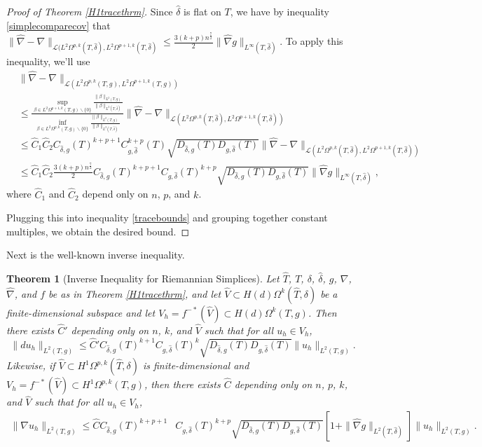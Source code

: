 \documentclass[11pt]{article}
\newtheorem{theorem}{Theorem}
\begin{document}
\begin{proof}[Proof of Theorem \ref{H1tracethrm}]
Since $\hat \delta$ is flat on $T$, we have by inequality \ref{simplecomparecov} that $\|\hat \nabla - \nabla\|_{\mathcal{L}(L^2\Omega^{p,k}(T,\hat \delta),L^2\Omega^{p+1,k}(T,\hat \delta)} \le \frac{3(k+p)n^\frac{7}{2}}{2}\|\hat \nabla g\|_{L^\infty(T,\hat \delta)}$. To apply this inequality, we'll use
\begin{align*}
&\|\hat \nabla - \nabla\|_{\mathcal{L}(L^2\Omega^{p,k}(T,g),L^2\Omega^{p+1,k}(T,g))} \\ 
&\le \frac{\sup_{\beta \in L^2\Omega^{p+1,k}(T,g) \backslash \{0\}} \frac{\|\beta\|_{L^2(T,g)}}{\|\beta\|_{L^2(T,\hat \delta)}}}{\inf_{\beta \in L^2\Omega^{p,k}(T,g) \backslash \{0\}}\frac{\|\beta\|_{L^2(T,g)}}{\|\beta\|_{L^2(T,\hat \delta)}}} \|\hat \nabla - \nabla\|_{\mathcal{L}(L^2\Omega^{p,k}(T,\hat \delta),L^2\Omega^{p+1,k}(T,\hat \delta))} \\
&\le \hat C_1\hat C_2 C_{\hat \delta,g}(T)^{k+p + 1}C_{g,\hat \delta}^{k+p}(T)\sqrt{D_{\hat \delta,g}(T)D_{g,\hat \delta}(T)}\|\hat \nabla - \nabla\|_{\mathcal{L}(L^2\Omega^{p,k}(T,\hat \delta),L^2\Omega^{p+1,k}(T,\hat \delta))} \\
&\le \hat C_1 \hat C_2 \frac{3(k+p)n^\frac{7}{2}}{2}C_{\hat \delta,g}(T)^{k+p+1}C_{g,\hat \delta}(T)^{k+p}\sqrt{D_{\hat \delta,g}(T)D_{g,\hat \delta}(T)} \|\hat \nabla g\|_{L^\infty(T,\hat \delta)},
\end{align*}
where $\hat C_1$ and $\hat C_2$ depend only on $n$, $p$, and $k$.

Plugging this into inequality \ref{tracebounds} and grouping together constant multiples, we obtain the desired bound.

\end{proof}
Next is the well-known inverse inequality.

\begin{theorem}[Inverse Inequality for Riemannian Simplices]
Let $\hat T$, $T$, $\delta$, $\hat \delta$, $g$, $\nabla$, $\hat{\nabla}$, and $f$ be as in Theorem \ref{H1tracethrm}, and let $\hat V \subset H(d)\Omega^k(\hat T,\delta)$ be a finite-dimensional subspace and let $V_h = f^{-*}(\hat V) \subset H(d)\Omega^k(T,g)$. Then there exists $\hat C'$ depending only on $n$, $k$, and $\hat V$ such that for all $u_h \in V_h$,
\[
\|du_h\|_{L^2(T,g)} \le \hat C' C_{\hat \delta,g}(T)^{k + 1}C_{g,\hat \delta}(T)^{k}\sqrt{D_{\hat \delta,g}(T)D_{g,\hat \delta}(T)}\|u_h\|_{L^2(T,g)}.
\]
Likewise, if $\hat{V} \subset H^1\Omega^{p,k}(\hat T,\delta)$ is finite-dimensional and $V_h = f^{-*}(\hat{V}) \subset H^1\Omega^{p,k}(T,g)$, then there exists $\hat C$ depending only on $n$, $p$, $k$, and $\hat V$ such that for all $u_h \in V_h$,
\begin{align*}
\|\nabla u_h\|_{L^2(T,g)} \le \hat CC_{ \hat \delta, g}(T)^{k+p + 1}&C_{g,\hat \delta}(T)^{k+p}\sqrt{D_{\hat \delta,g}(T)D_{g,\hat \delta}(T)}[1 + \|\hat \nabla g\|_{L^2(T,\hat \delta)}]\|u_h\|_{L^2(T,g)}.
\end{align*}

\end{theorem}
\end{document}
